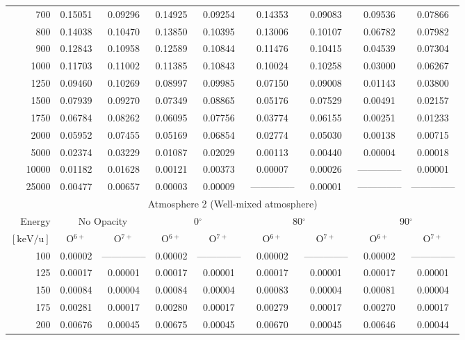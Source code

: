 \begin{table}[ht]
\begin{tabular}{r|c|c|c|c|c|c|c|c}
      700 & 0.15051 & 0.09296 & 0.14925 & 0.09254 & 0.14353 & 0.09083 & 0.09536 & 0.07866 \\
      800 & 0.14038 & 0.10470 & 0.13850 & 0.10395 & 0.13006 & 0.10107 & 0.06782 & 0.07982 \\
      900 & 0.12843 & 0.10958 & 0.12589 & 0.10844 & 0.11476 & 0.10415 & 0.04539 & 0.07304 \\
     1000 & 0.11703 & 0.11002 & 0.11385 & 0.10843 & 0.10024 & 0.10258 & 0.03000 & 0.06267 \\
     1250 & 0.09460 & 0.10269 & 0.08997 & 0.09985 & 0.07150 & 0.09008 & 0.01143 & 0.03800 \\
     1500 & 0.07939 & 0.09270 & 0.07349 & 0.08865 & 0.05176 & 0.07529 & 0.00491 & 0.02157 \\
     1750 & 0.06784 & 0.08262 & 0.06095 & 0.07756 & 0.03774 & 0.06155 & 0.00251 & 0.01233 \\
     2000 & 0.05952 & 0.07455 & 0.05169 & 0.06854 & 0.02774 & 0.05030 & 0.00138 & 0.00715 \\
     5000 & 0.02374 & 0.03229 & 0.01087 & 0.02029 & 0.00113 & 0.00440 & 0.00004 & 0.00018 \\
    10000 & 0.01182 & 0.01628 & 0.00121 & 0.00373 & 0.00007 & 0.00026 & -------------- & 0.00001 \\
    25000 & 0.00477 & 0.00657 & 0.00003 & 0.00009 & -------------- & 0.00001 & -------------- & -------------- \\ \cline{1-9}
    \multicolumn{9}{c}{Atmosphere 2 (Well-mixed atmosphere)} \\ \cline{2-9}
    Energy & \multicolumn{2}{c|}{No Opacity} & \multicolumn{2}{c|}{0$^\circ$} & \multicolumn{2}{c|}{80$^\circ$} & \multicolumn{2}{c}{90$^\circ$} \\ \cline{2-9}
    $\mathrm{[keV/u]}$ & O$^{6+}$ & O$^{7+}$ & O$^{6+}$ & O$^{7+}$ & O$^{6+}$ & O$^{7+}$ & O$^{6+}$ & O$^{7+}$ \\ \cline{1-9}
      100 & 0.00002 & -------------- & 0.00002 & -------------- & 0.00002 & -------------- & 0.00002 & -------------- \\
      125 & 0.00017 & 0.00001 & 0.00017 & 0.00001 & 0.00017 & 0.00001 & 0.00017 & 0.00001 \\
      150 & 0.00084 & 0.00004 & 0.00084 & 0.00004 & 0.00083 & 0.00004 & 0.00081 & 0.00004 \\
      175 & 0.00281 & 0.00017 & 0.00280 & 0.00017 & 0.00279 & 0.00017 & 0.00270 & 0.00017 \\
      200 & 0.00676 & 0.00045 & 0.00675 & 0.00045 & 0.00670 & 0.00045 & 0.00646 & 0.00044 \\

\end{tabular}
\end{table}
